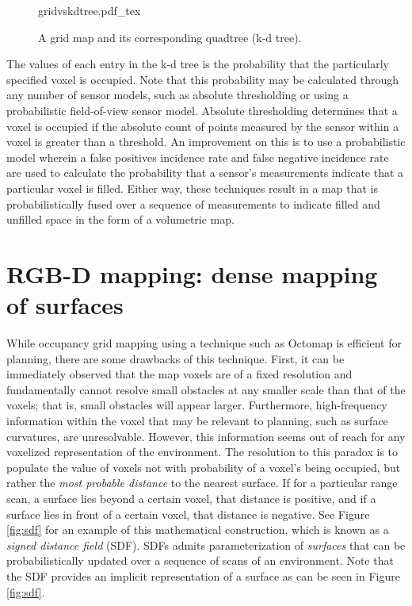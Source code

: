 \begin{figure}
    \centering
    \def\svgwidth{\textwidth}
    {gridvskdtree.pdf_tex}
    \caption{A grid map and its corresponding quadtree (k-d tree).\label{fig:gridvskdtree}}
\end{figure}

The values of each entry in the k-d tree is the probability that the particularly
specified voxel is occupied. Note that this probability may be calculated
through any number of sensor models, such as absolute thresholding or using a
probabilistic field-of-view sensor model. Absolute thresholding determines
that a voxel is occupied if the absolute count of points measured
by the sensor within a voxel is greater than a threshold. An improvement on this is
to use a probabilistic model wherein a false positives
incidence rate and false negative incidence rate are used to calculate the probability
that a sensor's measurements indicate that a particular voxel is filled. Either way,
these techniques result in a map that is probabilistically fused over a sequence of
measurements to indicate filled and unfilled space in the form of a volumetric map.


\section{RGB-D mapping: dense mapping of surfaces}
While occupancy grid mapping using a technique such as Octomap is efficient for
planning, there are some drawbacks of this technique. First, it can be immediately
observed that the map voxels are of a fixed resolution and fundamentally cannot
resolve small obstacles at any smaller scale than that of the voxels; that is, small
obstacles will appear larger. Furthermore, high-frequency information within the voxel
that may be relevant to planning, such as surface curvatures, are unresolvable.
However, this information seems out of reach for any voxelized representation of
the environment. The resolution to this paradox is to populate the value of voxels
not with probability of a voxel's being occupied, but rather the \emph{most probable distance}
to the nearest surface. If for a particular range scan, a surface lies beyond a certain voxel,
that distance is positive, and if a surface lies in front of a certain voxel,
that distance is negative. See Figure \ref{fig:sdf} for an example of this
mathematical construction, which is known as a \emph{signed distance field} (SDF).
SDFs admits parameterization of \emph{surfaces} that can be probabilistically updated
over a sequence of scans of an environment. Note that the SDF provides an implicit
representation of a surface as can be seen in Figure \ref{fig:sdf}.


